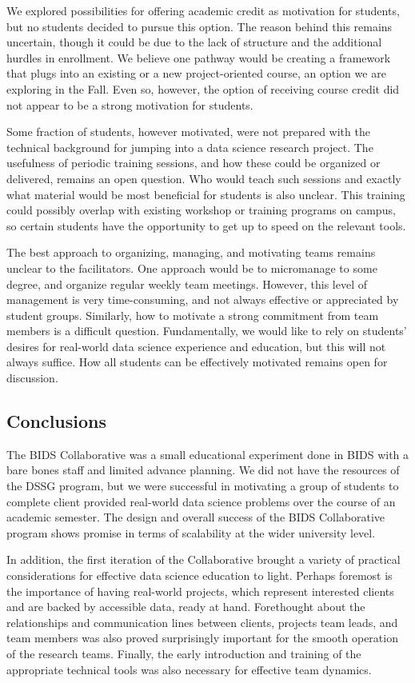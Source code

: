 \documentclass[12pt]{article}
\begin{document}
We explored possibilities for offering academic credit as motivation for students, but no students decided to pursue this option. The reason behind this remains uncertain, though it could be due to the lack of structure and the additional hurdles in enrollment. We believe one pathway would be creating a framework that plugs into an existing or a new project-oriented course, an option we are exploring in the Fall.  Even so, however, the option of receiving course credit did not appear to be a strong motivation for students.

Some fraction of students, however motivated, were not prepared with the technical background for jumping into a data science research project.  The usefulness of periodic training sessions, and how these could be organized or delivered, remains an open question.  Who would teach such sessions and exactly what material would be most beneficial for students is also unclear.  This training could possibly overlap with existing workshop or training programs on campus, so certain students have the opportunity to get up to speed on the relevant tools.

The best approach to organizing, managing, and motivating teams remains unclear to the facilitators.  One approach would be to micromanage to some degree, and organize regular weekly team meetings.  However, this level of management is very time-consuming, and not always effective or appreciated by student groups.  Similarly, how to motivate a strong commitment from team members is a difficult question.  Fundamentally, we would like to rely on students' desires for real-world data science experience and education, but this will not always suffice.  How all students can be effectively motivated remains open for discussion.

\subsection{Conclusions}

The BIDS Collaborative was a small educational experiment done in BIDS with a bare bones staff and limited advance planning. We did not have the resources of the DSSG program, but we were successful in motivating a group of students to complete client provided real-world data science problems over the course of an academic semester.  The design and overall success of the BIDS Collaborative program shows promise in terms of scalability at the wider university level.

In addition, the first iteration of the Collaborative brought a variety of practical considerations for effective data science education to light.  Perhaps foremost is the importance of having real-world projects, which represent interested clients and are backed by accessible data, ready at hand.  Forethought about the relationships and communication lines between clients, projects team leads, and team members was also proved surprisingly important for the smooth operation of the research teams.  Finally, the early introduction and training of the appropriate technical tools was also necessary for effective team dynamics.
\end{document}
